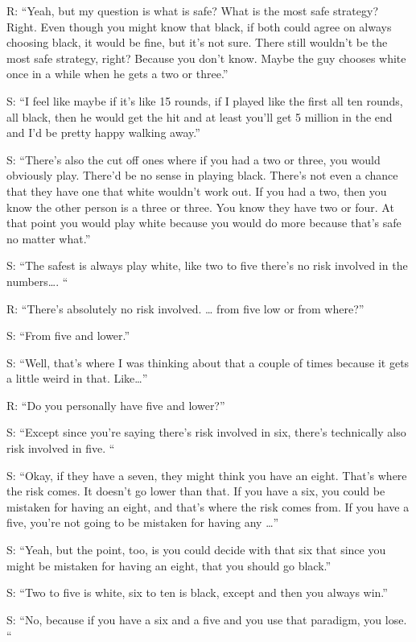 R: “Yeah, but my question is what is safe? What is the most safe strategy? Right. Even though you might know that black, if both could agree on always choosing black, it would be fine, but it's not sure. There still wouldn't be the most safe strategy, right? Because you don't know. Maybe the guy chooses white once in a while when he gets a two or three.”

S: “I feel like maybe if it's like 15 rounds, if I played like the first all ten rounds, all black, then he would get the hit and at least you'll get 5 million in the end and I'd be pretty happy walking away.”

S: “There's also the cut off ones where if you had a two or three, you would obviously play.  There'd be no sense in playing black. There's not even a chance that they have one that white wouldn't work out. If you had a two, then you know the other person is a three or three. You know they have two or four. At that point you would play white because you would do more because that's safe no matter what.”

S: “The safest is always play white, like two to five there's no risk involved in the numbers…. “ %

R: “There's absolutely no risk involved. … from five low or from where?”

S: “From five and lower.”

S: “Well, that's where I was thinking about that a couple of times because it gets a little weird in that. Like…”

R: “Do you personally have five and lower?”

S: “Except since you're saying there's risk involved in six, there's technically also risk involved in five. “

S: “Okay, if they have a seven, they might think you have an eight. That's where the risk comes. It doesn't go lower than that. If you have a six, you could be mistaken for having an eight, and that's where the risk comes from. If you have a five, you're not going to be mistaken for having any …”

S: “Yeah, but the point, too, is you could decide with that six that since you might be mistaken for having an eight, that you should go black.”

S: “Two to five is white, six to ten is black, except and then you always win.”

S: “No, because if you have a six and a five and you use that paradigm, you lose. “

